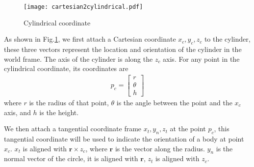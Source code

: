 \documentclass{article}
\begin{document}
\begin{figure}
	\centering
	\texttt{[image: cartesian2cylindrical.pdf]}
	\caption{Cylindrical coordinate}
	\label{fig:cylindrical}
\end{figure}
As shown in Fig.\ref{fig:cylindrical}, we first attach a Cartesian coordinate $x_c,y_c,z_c$ to the cylinder, these three vectors represent the location and orientation of the cylinder in the world frame. The axis of the cylinder is along the $z_c$ axis. For any point in the cylindrical coordinate, its coordinates are 
\begin{align}
p_c = \begin{bmatrix} r\\\theta\\ h\end{bmatrix}
\end{align}
where $r$ is the radius of that point, $\theta$ is the angle between the point and the $x_c$ axis, and $h$ is the height.

We then attach a tangential coordinate frame $x_t,y_n,z_t$ at the point $p_c$, this tangential coordinate will be used to indicate the orientation of a body at point $x_c$. $x_t$ is aligned with $\mathbf{r}\times z_c$, where $\mathbf{r}$ is the vector along the radius. $y_n$ is the normal vector of the circle, it is aligned with $\mathbf{r}$, $z_t$ is aligned with $z_c$.
\end{document}
